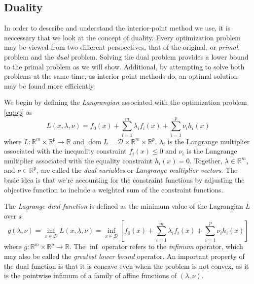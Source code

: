 
\subsection{Duality}
In order to describe and understand the interior-point method we use, it is neccessary that we look at the concept of duality. Every optimization problem may be viewed from two different perspectives, that of the original, or \emph{primal}, problem and the \emph{dual} problem. Solving the dual problem provides a lower bound to the primal problem as we will show. Additional, by attempting to solve both problems at the same time, as interior-point methods do, an optimal solution may be found more efficiently.

We begin by defining the \emph{Langrangian} associated with the optimization problem \eqref{eq:op} as
\begin{equation}
L(x, \lambda, \nu) = f_0(x) + \sum_{i=1}^m \lambda_i f_i(x)
+ \sum_{i=1}^p \nu_i h_i(x)
\end{equation}
where $L: \mathbb{R}^m \times \mathbb{R}^p \rightarrow \mathbb{R}$ and $\operatorname{dom} L = \mathcal{D} \times \mathbb{R}^m \times \mathbb{R}^p$. $\lambda_i$ is the Langrange multiplier associated with the inequality constraint $f_i(x) \leq 0$ and $\nu_i$ is the Langrange multiplier associated with the equality constraint $h_i(x) = 0$. Together, $\lambda \in \mathbb{R}^m$, and $\nu \in \mathbb{R}^p$, are called the \emph{dual variables} or \emph{Langrange multiplier vectors}. The basic idea is that we're accounting for the constraint functions by adjusting the objective function to include a weighted sum of the constraint functions.

The \emph{Lagrange dual function} is defined as the minimum value of the Lagrangian $L$ over $x$
\begin{equation}
g(\lambda, \nu) = \inf_{x \in \mathcal{D}} L(x, \lambda, \nu)
= \inf_{x \in \mathcal{D}} \left[ f_0(x) + \sum_{i=1}^m \lambda_i f_i(x)
+ \sum_{i=1}^p \nu_i h_i(x) \right]
\end{equation}
where $g: \mathbb{R}^m \times \mathbb{R}^p \rightarrow \mathbb{R}$. The $\inf$ operator refers to the \emph{infimum} operator, which may also be called the  \emph{greatest lower bound} operator. An important property of the dual function is that it is concave even when the problem is not convex, as it is the pointwise infimum of a family of affine functions of $(\lambda, \nu)$.

